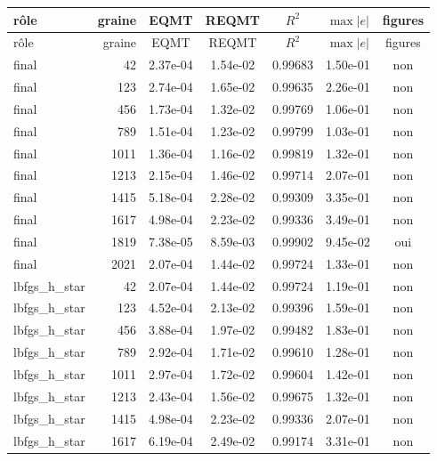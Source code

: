 \begin{longtable}{l r S[table-format=1.2e-2] S[table-format=1.2e-2] S[table-format=1.5] S[table-format=1.2e-2] c}
\toprule
{r\^ole} & {graine} & {EQMT} & {REQMT} & {\(R^2\)} & {\(\max|e|\)} & {figures} \\
\midrule
\endfirsthead
\toprule
{r\^ole} & {graine} & {EQMT} & {REQMT} & {\(R^2\)} & {\(\max|e|\)} & {figures} \\
\midrule
\endhead
\bottomrule
\endlastfoot
final & 42 & 2.37e-04 & 1.54e-02 & 0.99683 & 1.50e-01 & non \\
final & 123 & 2.74e-04 & 1.65e-02 & 0.99635 & 2.26e-01 & non \\
final & 456 & 1.73e-04 & 1.32e-02 & 0.99769 & 1.06e-01 & non \\
final & 789 & 1.51e-04 & 1.23e-02 & 0.99799 & 1.03e-01 & non \\
final & 1011 & 1.36e-04 & 1.16e-02 & 0.99819 & 1.32e-01 & non \\
final & 1213 & 2.15e-04 & 1.46e-02 & 0.99714 & 2.07e-01 & non \\
final & 1415 & 5.18e-04 & 2.28e-02 & 0.99309 & 3.35e-01 & non \\
final & 1617 & 4.98e-04 & 2.23e-02 & 0.99336 & 3.49e-01 & non \\
final & 1819 & 7.38e-05 & 8.59e-03 & 0.99902 & 9.45e-02 & oui \\
final & 2021 & 2.07e-04 & 1.44e-02 & 0.99724 & 1.33e-01 & non \\
lbfgs\_h\_star & 42 & 2.07e-04 & 1.44e-02 & 0.99724 & 1.19e-01 & non \\
lbfgs\_h\_star & 123 & 4.52e-04 & 2.13e-02 & 0.99396 & 1.59e-01 & non \\
lbfgs\_h\_star & 456 & 3.88e-04 & 1.97e-02 & 0.99482 & 1.83e-01 & non \\
lbfgs\_h\_star & 789 & 2.92e-04 & 1.71e-02 & 0.99610 & 1.28e-01 & non \\
lbfgs\_h\_star & 1011 & 2.97e-04 & 1.72e-02 & 0.99604 & 1.42e-01 & non \\
lbfgs\_h\_star & 1213 & 2.43e-04 & 1.56e-02 & 0.99675 & 1.32e-01 & non \\
lbfgs\_h\_star & 1415 & 4.98e-04 & 2.23e-02 & 0.99336 & 2.07e-01 & non \\
lbfgs\_h\_star & 1617 & 6.19e-04 & 2.49e-02 & 0.99174 & 3.31e-01 & non \\

\end{longtable}
